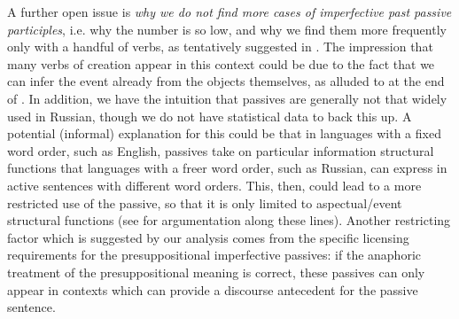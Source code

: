 \documentclass[output=paper,modfonts,newtxmath,hidelinks
]{langscibook}
\begin{document}
A further open issue is \textit{why we do not find more cases of imperfective past passive participles}, i.e. why the number is so low, and why we find them more frequently only with a handful of verbs, as tentatively suggested in . The impression that many verbs of creation appear in this context could be due to the fact that we can infer the event already from the objects themselves, as alluded to at the end of . In addition, we have the intuition that passives are generally not that widely used in Russian, though we do not have statistical data to back this up. A potential (informal) explanation for this could be that in languages with a fixed word order, such as English, passives take on particular information structural functions that languages with a freer word order, such as Russian, can express in active sentences with different word orders. This, then, could lead to a more restricted use of the passive, so that it is only limited to aspectual/event structural functions (see \citealt{abraham06} for argumentation along these lines). Another restricting factor which is suggested by our analysis comes from the specific licensing requirements for the presuppositional imperfective passives: if the anaphoric treatment of the presuppositional meaning is correct, these passives can only appear in contexts which can provide a discourse antecedent for the passive sentence.
\end{document}
